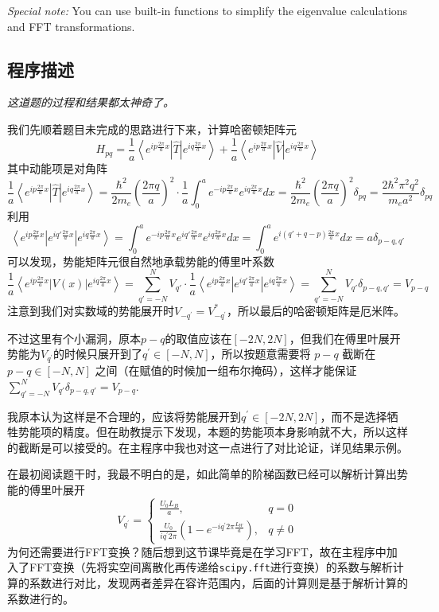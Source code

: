 \noindent \textit{Special note:} You can use built-in functions to simplify the eigenvalue calculations and FFT transformations.


\subsection{程序描述}
\textit{这道题的过程和结果都太神奇了。}

我们先顺着题目未完成的思路进行下来，计算哈密顿矩阵元
\[
H_{pq} = \frac{1}{a}\left\langle e^{ip\frac{2\pi}{a}x} \left| \hat{T} \right| e^{iq\frac{2\pi}{a}x} \right\rangle + \frac{1}{a}\left\langle e^{ip\frac{2\pi}{a}x} \left| \hat{V} \right| e^{iq\frac{2\pi}{a}x} \right\rangle
\]
其中动能项是对角阵
\[
    \frac{1}{a}\left\langle e^{ip\frac{2\pi}{a}x} \left| \hat{T} \right| e^{iq\frac{2\pi}{a}x} \right\rangle = \frac{\hbar^2}{2 m_e} \left( \frac{2\pi q}{a} \right)^2 \cdot\frac{1}{a}\int_0^a e^{-ip\frac{2\pi}{a}x} e^{iq\frac{2\pi}{a}x} dx= \frac{\hbar^2}{2 m_e} \left( \frac{2\pi q}{a} \right)^2 \delta_{pq} = \frac{2 \hbar^2 \pi^2 q^2}{m_e a^2} \delta_{pq}
\]
利用
\[
\left\langle e^{ip\frac{2\pi}{a}x} \left| e^{iq'\frac{2\pi}{a}x} \right| e^{iq\frac{2\pi}{a}x} \right\rangle = \int_0^a e^{-ip\frac{2\pi}{a}x} e^{iq'\frac{2\pi}{a}x} e^{iq\frac{2\pi}{a}x} dx = \int_0^a e^{i(q' + q - p)\frac{2\pi}{a}x} dx = a \delta_{p - q, q'}
\]
可以发现，势能矩阵元很自然地承载势能的傅里叶系数
\[
    \frac{1}{a}\left\langle e^{ip\frac{2\pi}{a}x} \left| V(x) \right| e^{iq\frac{2\pi}{a}x} \right\rangle = \sum_{q'=-N}^N V_{q'} \cdot \frac{1}{a} \left\langle e^{ip\frac{2\pi}{a}x} \left| e^{iq'\frac{2\pi}{a}x} \right| e^{iq\frac{2\pi}{a}x} \right\rangle=\sum_{q'=-N}^N V_{q'} \delta_{p - q, q'} = V_{p - q}
\]
注意到我们对实数域的势能展开时$V_{-q^{\prime}}=V_{-q^{\prime}}^{*}$，所以最后的哈密顿矩阵是厄米阵。


不过这里有个小漏洞，原本$p - q$的取值应该在$[-2N,2N]$，但我们在傅里叶展开势能为$V_{q^\prime}$的时候只展开到了$q^\prime \in [-N,N]$，所以按题意需要将 $p - q$ 截断在$ p - q  \in [-N,N]$ 之间（在赋值的时候加一组布尔掩码），这样才能保证$\sum_{q'=-N}^N V_{q'} \delta_{p - q, q'} = V_{p - q}.$

我原本认为这样是不合理的，应该将势能展开到$q^\prime \in [-2N,2N]$，而不是选择牺牲势能项的精度。但在助教提示下发现，本题的势能项本身影响就不大，所以这样的截断是可以接受的。在主程序中我也对这一点进行了对比论证，详见结果示例。

在最初阅读题干时，我最不明白的是，如此简单的阶梯函数已经可以解析计算出势能的傅里叶展开
\[
V_{q^{\prime}}=\begin{cases}\frac{U_0L_B}{a},&q=0\\\frac{U_0}{i{q^{\prime}}2\pi}\left(1-e^{-i{q^{\prime}}2\pi\frac{L_W}{a}}\right),&q\neq0\end{cases}
\]
为何还需要进行FFT变换？随后想到这节课毕竟是在学习FFT，故在主程序中加入了FFT变换（先将实空间离散化再传递给\texttt{scipy.fft}进行变换）的系数与解析计算的系数进行对比，发现两者差异在容许范围内，后面的计算则是基于解析计算的系数进行的。


